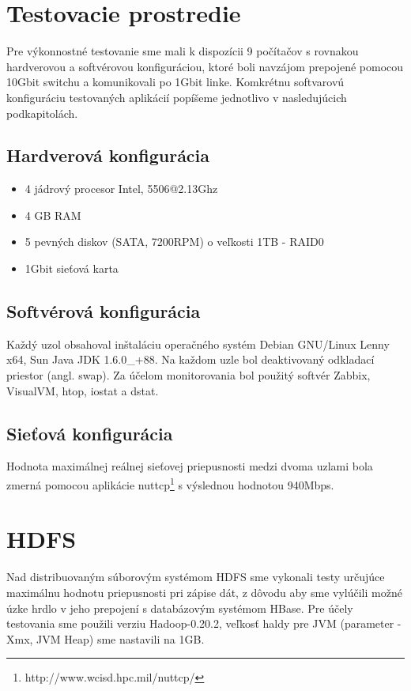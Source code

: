 \documentclass[11pt,twoside,a4paper]{book}
\begin{document}

\section{Testovacie prostredie}

Pre výkonnostné testovanie sme mali k dispozícii 9 počítačov s rovnakou hardverovou a softvérovou konfiguráciou, ktoré boli navzájom prepojené pomocou 10Gbit switchu a komunikovali po 1Gbit linke. Komkrétnu softvarovú konfiguráciu testovaných aplikácií popíšeme jednotlivo v nasledujúcich podkapitolách.

\subsection*{Hardverová konfigurácia}
\begin{itemize}
 \item 4 jádrový procesor Intel, 5506@2.13Ghz
 \item 4 GB RAM
 \item 5 pevných diskov (SATA, 7200RPM) o veľkosti 1TB - RAID0
 \item 1Gbit sieťová karta
\end{itemize}

\subsection*{Softvérová konfigurácia} 
Každý uzol obsahoval inštaláciu operačného systém Debian GNU/Linux Lenny x64, Sun Java JDK 1.6.0\_+88. Na každom uzle bol deaktivovaný odkladací priestor (angl. swap). Za účelom monitorovania bol použitý softvér Zabbix, VisualVM, htop, iostat a dstat.

\subsection*{Sieťová konfigurácia}

Hodnota maximálnej reálnej sieťovej priepusnosti medzi dvoma uzlami bola zmerná pomocou aplikácie nuttcp\footnote{http://www.wcisd.hpc.mil/nuttcp/} s výslednou hodnotou 940Mbps.

\section{HDFS}
Nad distribuovaným súborovým systémom HDFS sme vykonali testy určujúce maximálnu hodnotu priepusnosti pri zápise dát, z dôvodu aby sme vylúčili možné úzke hrdlo v jeho prepojení s databázovým systémom HBase. Pre účely testovania sme použili verziu Hadoop-0.20.2, veľkosť haldy pre JVM (parameter -Xmx, JVM Heap) sme nastavili na 1GB.
\end{document}
